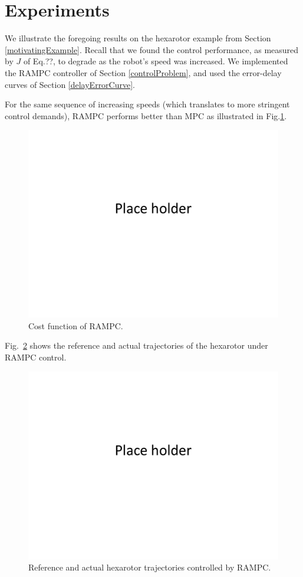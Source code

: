 \section{Experiments}
\label{experiments}

We illustrate the foregoing results on the hexarotor example from Section \ref{motivatingExample}.
Recall that we found the control performance, as measured by $J$ of Eq.??, to degrade as the robot's speed was increased.
We implemented the RAMPC controller of Section \ref{controlProblem}, and used the error-delay curves of Section \ref{delayErrorCurve}.

For the same sequence of increasing speeds (which translates to more stringent control demands), RAMPC performs better than MPC as illustrated in Fig.\ref{fig:RAMPCcost}.
\begin{figure}[t]
	\centering
	\includegraphics[width=0.7\linewidth]{figures/placeHolder}
	\caption{Cost function of RAMPC.}
	\label{fig:RAMPCcost}
\end{figure}

Fig.~\ref{fig:RAMPCtrajectory} shows the reference and actual trajectories of the hexarotor under RAMPC control.
\begin{figure}[t]
	\centering
	\includegraphics[width=0.7\linewidth]{figures/placeHolder}
	\caption{Reference and actual hexarotor trajectories controlled by RAMPC.}
	\label{fig:RAMPCtrajectory}
\end{figure}

